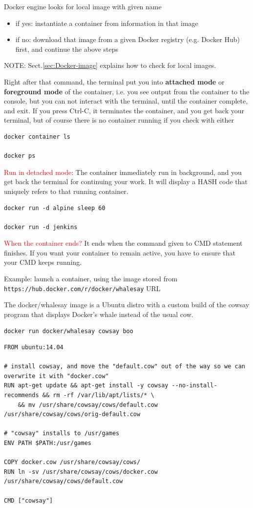 Docker engine looks for local image with given name
\begin{itemize}
  \item if yes: instantiate a container from information in that image
  \item if no: download that image from a given Docker registry (e.g. Docker Hub) first, and continue the above steps
\end{itemize}
NOTE: Sect.\ref{sec:Docker-image} explains how to check for local images.


Right after that command, the terminal put you into {\bf attached mode} or {\bf
foreground mode} of the container, i.e. you see output from the container to the
console, but you can not interact with the terminal, until the container
complete, and exit. If you press Ctrl-C, it terminates the container, and you
get back your terminal, but of course there is no container running if you check
with either
\begin{verbatim}
docker container ls

docker ps
\end{verbatim}



\textcolor{red}{Run in detached mode}: The container immediately run in
background, and you get back the terminal for continuing your work. It will
display a HASH code that uniquely refers to that running container.

\begin{verbatim}
docker run -d alpine sleep 60  

docker run -d jenkins
\end{verbatim}

\textcolor{red}{When the container ends?} It ends when the command given to CMD
statement finishes. If you want your container to remain active, you have to
ensure that your CMD keeps running.


Example: launch a container, using the image stored from 
\verb!https://hub.docker.com/r/docker/whalesay! URL 

\label{sec:docker/whalesay}
The docker/whalesay image is a Ubuntu distro with a custom build of the cowsay
program that displays Docker’s whale instead of the usual cow.

\begin{verbatim}
docker run docker/whalesay cowsay boo
\end{verbatim}

\begin{verbatim}
FROM ubuntu:14.04

# install cowsay, and move the "default.cow" out of the way so we can overwrite it with "docker.cow"
RUN apt-get update && apt-get install -y cowsay --no-install-recommends && rm -rf /var/lib/apt/lists/* \
    && mv /usr/share/cowsay/cows/default.cow /usr/share/cowsay/cows/orig-default.cow

# "cowsay" installs to /usr/games
ENV PATH $PATH:/usr/games

COPY docker.cow /usr/share/cowsay/cows/
RUN ln -sv /usr/share/cowsay/cows/docker.cow /usr/share/cowsay/cows/default.cow

CMD ["cowsay"]
\end{verbatim}




